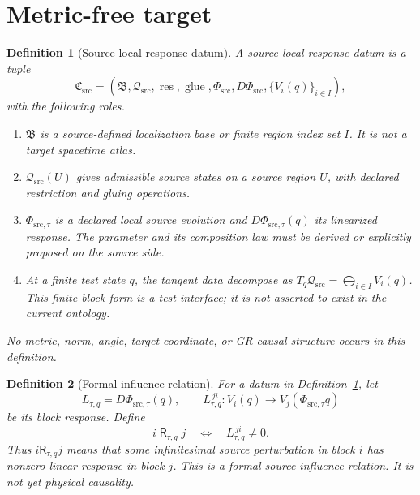 \documentclass[11pt]{article}
\newtheorem{definition}{Definition}
\newcommand{\Qsrc}{\mathcal Q_{\mathrm{src}}}
\newcommand{\Rel}{\mathsf R}
\begin{document}
\section{Metric-free target}

\begin{definition}[Source-local response datum]
\label{def:datum}
A \emph{source-local response datum} is a tuple
\[
 \mathfrak C_{\mathrm{src}}=
 (\mathfrak B,\Qsrc,\operatorname{res},\operatorname{glue},
 \Phi_{\mathrm{src}},D\Phi_{\mathrm{src}},\{V_i(q)\}_{i\in I}),
\]
with the following roles.
\begin{enumerate}
  \item \(\mathfrak B\) is a source-defined localization base or finite region
  index set \(I\).  It is not a target spacetime atlas.
  \item \(\Qsrc(U)\) gives admissible source states on a source region \(U\),
  with declared restriction and gluing operations.
  \item \(\Phi_{\mathrm{src},\tau}\) is a declared local source evolution and
  \(D\Phi_{\mathrm{src},\tau}(q)\) its linearized response.  The parameter and its
  composition law must be derived or explicitly proposed on the source side.
  \item At a finite test state \(q\), the tangent data decompose as
  \(T_q\Qsrc=\bigoplus_{i\in I}V_i(q)\).  This finite block form is a test
  interface; it is not asserted to exist in the current ontology.
\end{enumerate}
No metric, norm, angle, target coordinate, or GR causal structure occurs in
this definition.
\end{definition}

\begin{definition}[Formal influence relation]
\label{def:influence}
For a datum in Definition~\ref{def:datum}, let
\[
 L_{\tau,q}=D\Phi_{\mathrm{src},\tau}(q),\qquad
 L_{\tau,q}^{\,ji}:V_i(q)\longrightarrow
 V_j(\Phi_{\mathrm{src},\tau}q)
\]
be its block response.  Define
\[
 i\;\Rel_{\tau,q}\;j
 \quad\Longleftrightarrow\quad
 L_{\tau,q}^{\,ji}\neq0.
\]
Thus \(i\Rel_{\tau,q}j\) means that some infinitesimal source perturbation in
block \(i\) has nonzero linear response in block \(j\).  This is a
\emph{formal source influence} relation.  It is not yet physical causality.
\end{definition}
\end{document}
